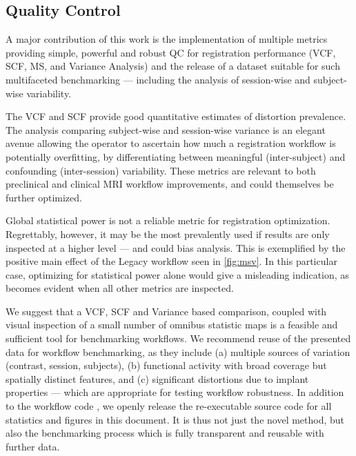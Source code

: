 \subsection{Quality Control}

A major contribution of this work is the implementation of multiple metrics providing simple, powerful and robust QC for registration performance (VCF, SCF, MS, and Variance Analysis) and the release of a dataset \cite{mlebe_bidsdata} suitable for such multifaceted benchmarking --- including the analysis of session-wise and subject-wise variability.

The VCF and SCF provide good quantitative estimates of distortion prevalence.
The analysis comparing subject-wise and session-wise variance is an elegant avenue allowing the operator to ascertain how much a registration workflow is potentially overfitting, by differentiating between meaningful (inter-subject) and confounding (inter-session) variability.
These metrics are relevant to both preclinical and clinical MRI workflow improvements, and could themselves be further optimized.

Global statistical power is not a reliable metric for registration optimization.
Regrettably, however, it may be the most prevalently used if results are only inspected at a higher level --- and could bias analysis.
This is exemplified by the positive main effect of the Legacy workflow seen in \cref{fig:msv}.
In this particular case, optimizing for statistical power alone would give a misleading indication, as becomes evident when all other metrics are inspected.

We suggest that a VCF, SCF and Variance based comparison, coupled with visual inspection of a small number of omnibus statistic maps is a feasible and sufficient tool for benchmarking workflows.
We recommend reuse of the presented data for workflow benchmarking, as they include (a) multiple sources of variation (contrast, session, subjects), (b) functional activity with broad coverage but spatially distinct features, and (c) significant distortions due to implant properties --- which are appropriate for testing workflow robustness.
In addition to the workflow code \cite{samri}, we openly release the re-executable source code \cite{source} for all statistics and figures in this document.
It is thus not just the novel method, but also the benchmarking process which is fully transparent and reusable with further data.

